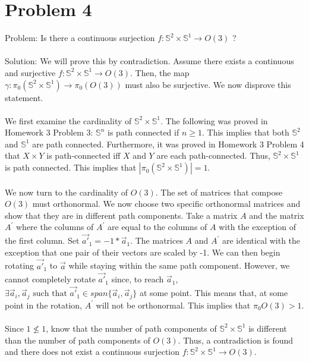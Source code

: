 \documentclass{article}
\begin{document}
\section*{Problem 4}
Problem: Is there a continuous surjection
$f: \mathbb{S}^2 \times \mathbb{S}^1 \to O(3)$
? \\\\
Solution: We will prove this by contradiction. Assume there exists a continuous and surjective 
$f: \mathbb{S}^2 \times \mathbb{S}^1 \to O(3)$.
Then, the map
$\gamma : \pi_0(\mathbb{S}^2 \times \mathbb{S}^1) \to \pi_0 (O(3))$
must also be surjective. We now disprove this statement. \\\\
We first examine the cardinality of
$\mathbb{S}^2 \times \mathbb{S}^1$.
The following was proved in Homework 3 Problem 3:
$\mathbb{S}^n$
is path connected if 
$n \geq 1$.
This implies that both
$\mathbb{S}^2$
and $\mathbb{S}^1$
are path connected. Furthermore, it was proved in Homework 3 Problem 4 that
$X \times Y$
is path-connected iff
$X$
and
$Y$
are each path-connected.
Thus,
$\mathbb{S}^2 \times \mathbb{S}^1$
is path connected. This implies that
$| \pi_0 (\mathbb{S}^2 \times \mathbb{S}^1) | = 1$. \\\\
We now turn to the cardinality of
$O(3)$.
The set of matrices that compose
$O(3)$
must orthonormal. We now choose two specific orthonormal matrices and show that they are in different path components. Take a matrix 
$A$
and the matrix
$A^\prime$
where the columns of
$A^\prime$
are equal to the columns of
$A$
with the exception of the first column. Set
$\vec{a\prime}_1 = -1 * \vec{a}_1$.
The matrices
$A$
and
$A^\prime$
are identical with the exception that one pair of their vectors are scaled by -1. We can then begin rotating
$\vec{a\prime}_1$
to
$\vec{a}$
while staying within the same path component. However, we cannot completely rotate
$\vec{a\prime}_1$
since, to reach
$\vec{a}_1$,
$\exists \vec{a}_i, \vec{a}_j \text{ such that } \vec{a\prime}_1 \in span\{\vec{a}_i, \vec{a}_j \}$
at some point. This means that, at some point in the rotation,
$A^\prime$
will not be orthonormal. This implies that
$\pi_0 O(3) > 1$. \\\\
Since
$1 \nleq 1$,
know that the number of path components of
$\mathbb{S}^2 \times \mathbb{S}^1$
is different than the number of path components of
$O(3)$. Thus, a contradiction is found and there does not exist a continuous surjection
$f: \mathbb{S}^2 \times \mathbb{S}^1 \to O(3)$.
\end{document}
